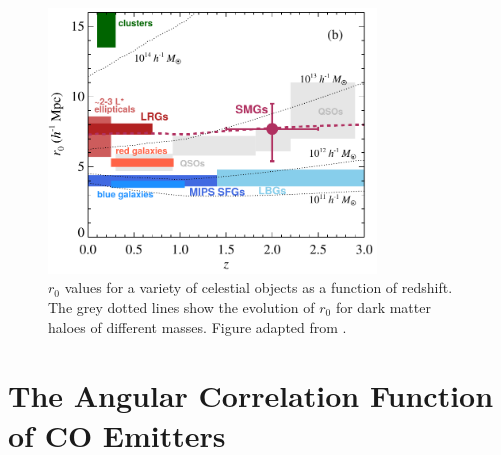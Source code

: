 \begin{figure}[!htbp]
\centering \includegraphics[width=87mm]{clustering/Hickox2012_Compare.png}
\caption{$r_0$ values for a variety of celestial objects as a function of redshift. The grey dotted lines show the evolution of $r_0$ for dark matter haloes of different masses. Figure adapted from \cite{10.1111/j.1365-2966.2011.20303.x}.}
\label{fig:Hickox_compare}
\end{figure}

\section{The Angular Correlation Function of CO Emitters}

